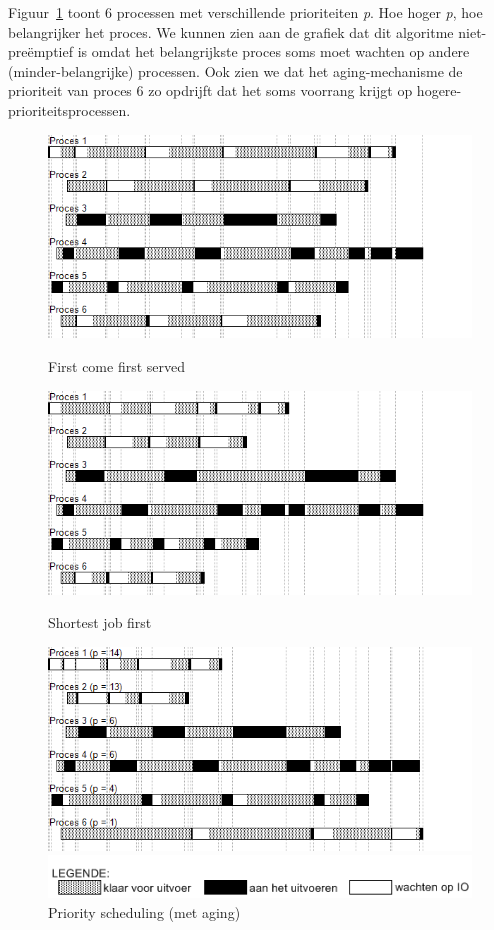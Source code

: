 Figuur~\ref{fig:schedpsnopre} toont 6 processen met verschillende prioriteiten \emph{p}. Hoe hoger \emph{p}, hoe belangrijker het proces. We kunnen zien aan de grafiek dat dit algoritme niet-pre\"emptief is omdat het belangrijkste proces soms moet wachten op andere (minder-belangrijke) processen. Ook zien we dat het aging-mechanisme de prioriteit van proces 6 zo opdrijft dat het soms voorrang krijgt op hogere-prioriteitsprocessen.

\begin{figure}
\centering
  \includegraphics[width=\linewidth]{images/schedule_fcfs.png}
  \caption{First come first served}
  \label{fig:schedfcfs}
  \centering
  \includegraphics[width=\linewidth]{images/schedule_sjf.png}
  \caption{Shortest job first}
  \label{fig:schedsjf}
  \centering
  \includegraphics[width=\linewidth]{images/schedule_ps_noqua_age.png}
  \caption{Priority scheduling (met aging)}
  \label{fig:schedpsnopre}
  \includegraphics[width=0.8\linewidth]{images/legende.png}
\end{figure}

